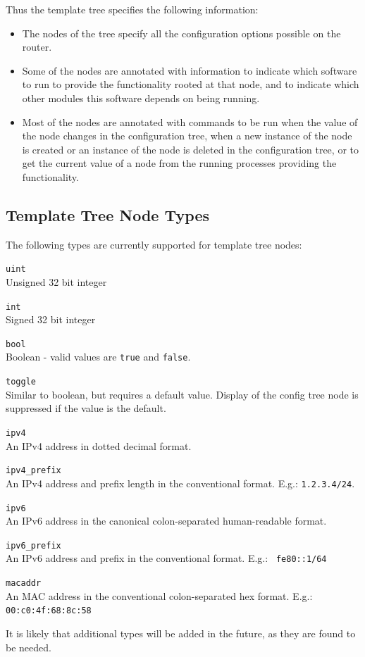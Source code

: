 \documentclass[11pt]{article}
\begin{document}
Thus the template tree specifies the following information:
\begin{itemize}
\item The nodes of the tree specify all the configuration options
possible on the router.
\item Some of the nodes are annotated with information to indicate
which software to run to provide the functionality rooted at that
node, and to indicate which other modules this software depends on
being running.
\item Most of the nodes are annotated with commands to be run when the
value of the node changes in the configuration tree, when a new
instance of the node is created or an instance of the node is deleted
in the configuration tree, or to get the current value of a node from
the running processes providing the functionality.
\end{itemize}
\subsection{Template Tree Node Types}
The following types are currently supported for template tree nodes:
\begin{description}
\item{\tt uint}\\
Unsigned 32 bit integer
\item{\tt int}\\
Signed 32 bit integer
\item{\tt bool}\\
Boolean - valid values are {\tt true} and {\tt false}.
\item{\tt toggle}\\
Similar to boolean, but requires a default value.  Display of the
config tree node is suppressed if the value is the default.
\item{\tt ipv4}\\
An IPv4 address in dotted decimal format.
\item{\tt ipv4\_prefix}\\ An IPv4 address and prefix length in the
conventional format.  E.g.: {\tt 1.2.3.4/24}.
\item{\tt ipv6}\\
An IPv6 address in the canonical colon-separated human-readable format.
\item{\tt ipv6\_prefix}\\
An IPv6 address and prefix in the conventional format. E.g.: {\tt
fe80::1/64}
\item{\tt macaddr}\\
An MAC address in the conventional colon-separated hex format.  E.g.:
{\tt 00:c0:4f:68:8c:58}
\end{description}
It is likely that additional types will be added in the future, as
they are found to be needed.
\end{document}
